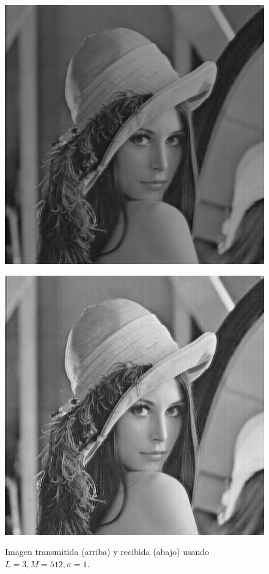 \documentclass[10pt,journal,compsoc]{IEEEtran}
\begin{document}
\begin{figure}
\begin{center}
\label{fig:refuerzos2}
\centering
\begin{minipage}{.5\textwidth}
  \centering

  \includegraphics[scale=0.25]{../Linterno5/512/3/imgTrans.jpg}
  \label{fig:sub1}
\end{minipage}
\vspace{0cm}
\begin{minipage}{.5\textwidth}
  \centering
  \includegraphics[scale=0.25]{../Linterno5/512/3/imgRec.jpg}
  \label{fig:sub2}
\end{minipage}
\caption{Imagen transmitida (arriba) y recibida (abajo) usando $L=3 , M=512, \sigma=1$.}
\label{fig:test}
\end{center}
\end{figure}
\end{document}
